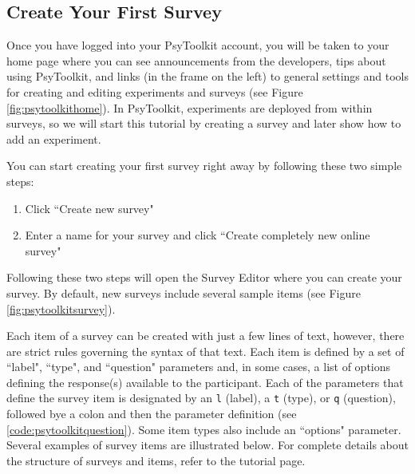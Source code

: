 \subsection{Create Your First Survey}
Once you have logged into your PsyToolkit account, you will be taken to your home page where you can see announcements from the developers, tips about using PsyToolkit, and links (in the frame on the left) to general settings and tools for creating and editing experiments and surveys (see Figure \ref{fig:psytoolkithome}).  In PsyToolkit, experiments are deployed from within surveys, so we will start this tutorial by creating a survey and later show how to add an experiment.

You can start creating your first survey right away by following these two simple steps:
\begin{enumerate}
    \item Click ``Create new survey"
    \item Enter a name for your survey and click ``Create completely new online survey"
\end{enumerate}
Following these two steps will open the Survey Editor where you can create your survey.  By default, new surveys include several sample items (see Figure \ref{fig:psytoolkitsurvey}).


Each item of a survey can be created with just a few lines of text, however, there are strict rules governing the syntax of that text.  Each item is defined by a set of ``label", ``type", and ``question" parameters and, in some cases, a list of options defining the response(s) available to the participant. Each of the parameters that define the survey item is designated by an \texttt{l} (label), a \texttt{t} (type), or \texttt{q} (question), followed bye a colon and then the parameter definition (see \ref{code:psytoolkitquestion}).  Some item types also include an ``options" parameter.  Several examples of survey items are illustrated below. For complete details about the structure of surveys and items, refer to the  tutorial page.  

